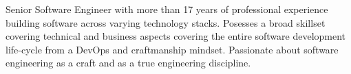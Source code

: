 
Senior Software Engineer with more than 17 years of professional experience building software across varying technology stacks.
Posesses a broad skillset covering technical and business aspects covering the entire software development life-cycle from a DevOps and craftmanship mindset. 
Passionate about software engineering as a craft and as a true engineering discipline.

